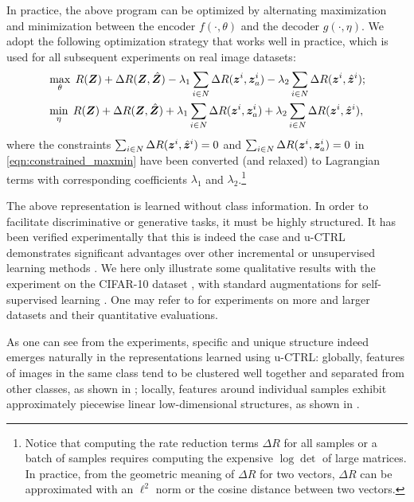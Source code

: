 \documentclass[../../book-main.tex]{subfiles}
\begin{document}
In practice, the above program can be optimized by alternating maximization and minimization between the encoder $f(\cdot,\theta)$ and the decoder $g(\cdot,\eta)$. We adopt the following optimization strategy that works well in practice, which is used for all subsequent experiments on real image datasets:
\vspace{-1mm}
\begin{align}
  &  \max_{\theta}\; R(\bm{Z}) + \Delta{R(\bm{Z}, \hat{\bm{Z}})-\lambda_{1}\sum_{i\in N} \Delta R(\bm{z}^i, \bm{z}_{a}^i)} -\lambda_{2}\sum_{i\in N} \Delta R(\bm{z}^i, \hat{\bm{z}}^i) \label{eqn:constrained_max}; \\
   & \min_{\eta}\; R(\bm{Z}) + \Delta{R(\bm{Z}, \hat{\bm{Z}})+\lambda_{1}\sum_{i\in N} \Delta R(\bm{z}^i, \bm{z}_{a}^i)+ \lambda_{2}\sum_{i\in N} \Delta R(\bm{z}^i, \hat{\bm{z}}^i)} \label{eqn:constrained_min}, 
\end{align}
where the constraints $\sum_{i\in N} \Delta R(\bm{z}^i, \hat{\bm{z}}^i) = 0$ and $\sum_{i\in N} \Delta R(\bm{z}^i, \bm{z}_{a}^i) = 0$ in \eqref{eqn:constrained_maxmin} have been converted (and relaxed) to Lagrangian terms with corresponding coefficients $\lambda_{1}$ and  $\lambda_{2}$.\footnote{Notice that computing the rate reduction terms $\Delta R$ for all samples or a batch of samples requires computing the expensive $\log\det$ of large matrices. In practice, from the geometric meaning of $\Delta R$ for two vectors, $\Delta R$ can be approximated with an $\ell^2$ norm or the cosine distance between two vectors.}

The above representation is learned without class information. In order to facilitate discriminative or generative tasks, it must be highly structured. It has been verified experimentally that this is indeed the case and u-CTRL demonstrates significant advantages over other incremental or unsupervised learning methods \cite{pmlr-v234-tong24a}. We here only illustrate some qualitative results with the experiment on the CIFAR-10 dataset \cite{krizhevsky2014cifar}, with standard augmentations for self-supervised learning \cite{chen2020simple}. One may refer to \cite{pmlr-v234-tong24a} for experiments on more and larger datasets and their quantitative evaluations. 

As one can see from the experiments, specific and unique structure indeed emerges naturally in the representations learned using u-CTRL: globally, features of images in the same class tend to be clustered well together and separated from other classes, as shown in ; locally, features around individual samples exhibit approximately piecewise linear low-dimensional structures, as shown in . 
\end{document}
